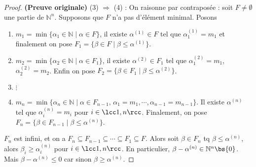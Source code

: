 \documentclass[11pt]{article}
\newcommand{\cor}[1]{{\color{red} #1}}
\begin{document}
\begin{proof} \textbf{(Preuve originale)}
    (3) $\Rightarrow$ (4) : On raisonne par contraposée : soit $F \neq \emptyset$ une partie de $\mathbb{N}^n$. Supposons que $F$ n'a pas d'élément minimal. Posons
    \begin{enumerate}
        \item $m_1 = \min \{\alpha_1 \in \mathbb{N} \mid \alpha \in F\}$, il existe $\alpha^{(1)} \in F$ tel que $\alpha_1^{(1)} = m_1$ et finalement on pose $F_1 = \{\beta \in F \mid \beta \leq \alpha^{(1)}\}$.
        \item $m_2 = \min \{\alpha_2 \in \mathbb{N} \mid \alpha \in F_1\}$, \cor{il existe} $\alpha^{(2)} \in F_1$ tel que $\alpha^{(2)}_1 = m_1$, $\alpha^{(2)}_2 = m_2$. Enfin on pose $F_2 = \{\beta \in F_1 \mid \beta \leq \alpha^{(2)}\}$.
        \item $\vdots$
        \item $m_n = \min \{\alpha_n \in \mathbb{N} \mid \alpha \in F_{n-1},\, \alpha_1 = m_1, \cdots, \alpha_{n-1} = m_{n-1}\}$. Il existe $\alpha^{(n)}$ tel que $\alpha_i^{(n)} = m_i$ pour $i \in \lcc 1,n \rcc$. Finalement, on pose $F_n = \{\beta \in F_{n-1} \mid \beta \leq \alpha^{(n)}\}$.
    \end{enumerate}
    $F_n$ est infini, et on a $F_n \subseteq F_{n-1} \subseteq \cdots \subseteq F_1 \subseteq F$. Alors soit $\beta \in F_n$ tq $\beta \leq \alpha^{(n)}$, alors $\beta_i \geq \alpha_i^{(n)}$ pour $i \in \lcc 1,n \rcc$. En particulier, $\beta - \alpha^{(n)} \in \mathbb{N}^n \bs \{0\}$. Mais $\beta - \alpha^{(n)} \leq 0$ car sinon $\beta \geq \alpha^{(n)}$.
\end{proof}
\cleardoublepage
\end{document}
